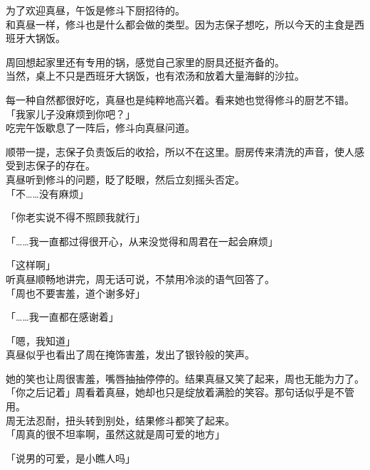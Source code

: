 \vspace{2\baselineskip}

为了欢迎真昼，午饭是修斗下厨招待的。\\

和真昼一样，修斗也是什么都会做的类型。因为志保子想吃，所以今天的主食是西班牙大锅饭。

周回想起家里还有专用的锅，感觉自己家里的厨具还挺齐备的。\\

当然，桌上不只是西班牙大锅饭，也有浓汤和放着大量海鲜的沙拉。

每一种自然都很好吃，真昼也是纯粹地高兴着。看来她也觉得修斗的厨艺不错。\\

「我家儿子没麻烦到你吧？」\\

吃完午饭歇息了一阵后，修斗向真昼问道。

顺带一提，志保子负责饭后的收拾，所以不在这里。厨房传来清洗的声音，使人感受到志保子的存在。\\

真昼听到修斗的问题，眨了眨眼，然后立刻摇头否定。\\

「不……没有麻烦」

「你老实说不得不照顾我就行」

「……我一直都过得很开心，从来没觉得和周君在一起会麻烦」

「这样啊」\\

听真昼顺畅地讲完，周无话可说，不禁用冷淡的语气回答了。\\

「周也不要害羞，道个谢多好」

「……我一直都在感谢着」

「嗯，我知道」\\

真昼似乎也看出了周在掩饰害羞，发出了银铃般的笑声。

她的笑也让周很害羞，嘴唇抽抽停停的。结果真昼又笑了起来，周也无能为力了。\\

「你之后记着」周看着真昼，她却也只是绽放着满脸的笑容。那句话似乎是不管用。\\

周无法忍耐，扭头转到别处，结果修斗都笑了起来。\\

「周真的很不坦率啊，虽然这就是周可爱的地方」

「说男的可爱，是小瞧人吗」

